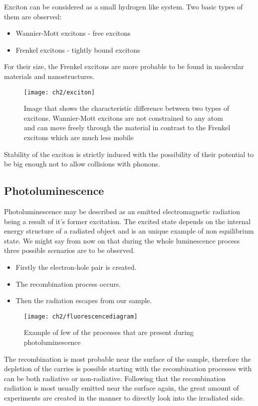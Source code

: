 Exciton can be considered as a small hydrogen like system. Two basic types of them are observed:

\begin{itemize}
\item Wannier-Mott excitons - free excitons
\item Frenkel excitons - tightly bound excitons
\end{itemize}

For their size, the Frenkel excitons are more probable to be found in molecular materials and nanostructures. 

\begin{figure}[H]
\centering
\texttt{[image: ch2/exciton]}
\caption{Image that shows the characteristic difference between two types of excitons. Wannier-Mott excitons are not constrained to any atom and can move freely through the material in contrast to the Frenkel excitons which are much less mobile\cite{fox}}
\end{figure}

Stability of the exciton is strictly induced with the possibility of their potential to be big enough not to allow collisions with phonons.

\subsection{Photoluminescence}

Photoluminescence may be described as an emitted electromagnetic radiation being a result of it's former excitation. The excited state depends on the internal energy structure of a radiated object and is an unique example of non equilibrium state. We might say from now on that during the whole luminescence process three possible scenarios are to be observed. 
\begin{itemize}
\item Firstly the electron-hole pair is created.
\item The recombination process occurs.
\item Then the radiation escapes from our sample.
\end{itemize}

\begin{figure}[H]
\centering
\texttt{[image: ch2/fluorescencediagram]}
\caption{Example of few of the processes that are present during photoluminescence\cite{fox}}
\end{figure}


The recombination is most probable near the surface of the sample, therefore the depletion of the carries is possible starting with the recombination processes with can be both radiative or non-radiative. Following that the recombination radiation is most usually emitted near the surface again, the great amount of experiments are created in the manner to directly look into the irradiated side.

